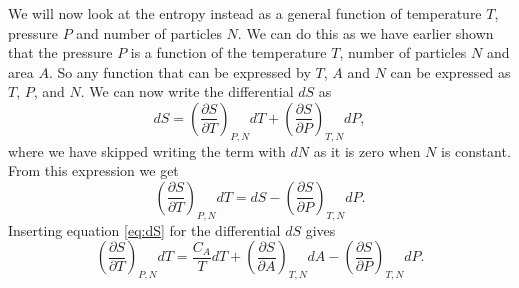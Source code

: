 \documentclass[a4paper, 11pt, titlepage, english]{article}
\newcommand{\beq}{\begin{equation}}
\newcommand{\eeq}{\end{equation}}
\begin{document}
We will now look at the entropy instead as a general function of temperature $T$, pressure $P$ and number of particles $N$. We can do this as we have earlier shown that the pressure $P$ is a function of the temperature $T$, number of particles $N$ and area $A$. So any function that can be expressed by $T$, $A$ and $N$ can be expressed as $T$, $P$, and $N$. We can now write the differential $dS$ as
$$dS = \left(\frac{\partial S}{\partial T}\right)_{P, N} dT + \left(\frac{\partial S}{\partial P}\right)_{T, N} dP,$$
where we have skipped writing the term with $dN$ as it is zero when $N$ is constant. From this expression we get
$$\left( \frac{\partial S}{\partial T}\right)_{P,N} dT = dS - \left(\frac{\partial S}{\partial P}\right)_{T, N} dP.$$
Inserting equation \ref{eq:dS} for the differential $dS$ gives
\beq
\left( \frac{\partial S}{\partial T}\right)_{P,N}dT = \frac{C_A}{T}dT +  \left(\frac{\partial S}{\partial A}\right)_{T, N} dA - \left(\frac{\partial S}{\partial P}\right)_{T, N} dP. \label{eq:dA}
\eeq
\end{document}
